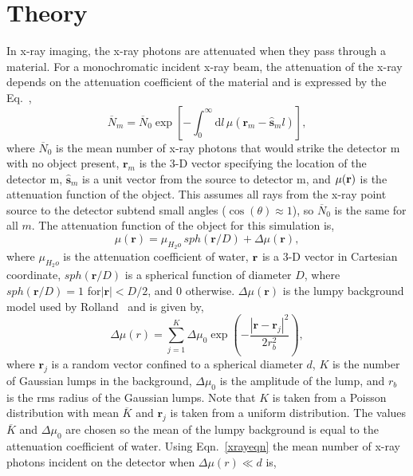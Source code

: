 \section{Theory}
In x-ray imaging, the x-ray photons are attenuated when they pass through a material.  For a monochromatic incident x-ray beam, the attenuation of the x-ray depends on the attenuation coefficient of the material and is expressed by the Eq.~\citep{Barrett2004},
%
\begin{equation}
\label{xrayeqn}
\overline{N}_m = \overline{N}_0 \exp\left[-\int_0^{\infty} \! \mathrm{d}l \,\mu(\mathbf{r}_{m}-\hat{\mathbf{s}}_m l )\right],
\end{equation}
%
where $\overline{N}_0$ is the mean number of x-ray photons that would strike the detector m with no object present, $\mathbf{r}_m$ is the 3-D vector specifying the location of the detector m, $\mathbf{\hat{s}}_m$ is a unit vector from the source to detector m, and $\mu(\bf{r})$ is the attenuation function of the object.  This assumes all rays from the x-ray point source to the detector subtend small angles ($\cos(\theta)\approx 1$), so $\overline{N}_0$ is the same for all $m$.  The attenuation function of the object for this simulation is,
%
\begin{equation}
\label{obj_eqn}
\mu({\mathbf{r}}) = \mu_{H_2o} \, sph(\mathbf{r}/D) + \Delta\mu({\mathbf{r}}), 
\end{equation}
%
where $\mu_{H_2o}$ is the attenuation coefficient of water, $\bf{r}$ is a 3-D vector in Cartesian coordinate, $sph(\textbf{r}/D)$ is a spherical function of diameter $D$, where $sph(\textbf{r}/D)=1$ for$|\textbf{r}|<D/2$, and $0$ otherwise.  $\Delta \mu(\textbf{r})$ is the lumpy background model used by Rolland~\citep{Rolland1992} and is given by,
%
\begin{equation}
\label{lumpy}
\Delta\mu(r) = \sum\limits_{j = 1}^{K}\Delta\mu_0 \exp\left(-\frac{|\mathbf{r}-\mathbf{r}_j|^2}{2r_b^2}   \right),
\end{equation}
%
where $\mathbf{r}_j$ is a random vector confined to a spherical diameter $d$, $K$ is the number of Gaussian lumps in the background, $\Delta\mu_0$ is the amplitude of the lump, and $r_b$ is the rms radius of the Gaussian lumps.  Note that $K$ is taken from a Poisson distribution with mean $\overline{K}$ and $\mathbf{r}_j$ is taken from a uniform distribution.  The values $\overline{K}$ and $\Delta\mu_0$ are chosen so the mean of the lumpy background is equal to the attenuation coefficient of water.
%
Using Eqn.~\ref{xrayeqn} the mean number of x-ray photons incident on the detector when $\Delta\mu(r) \ll d$ is,
